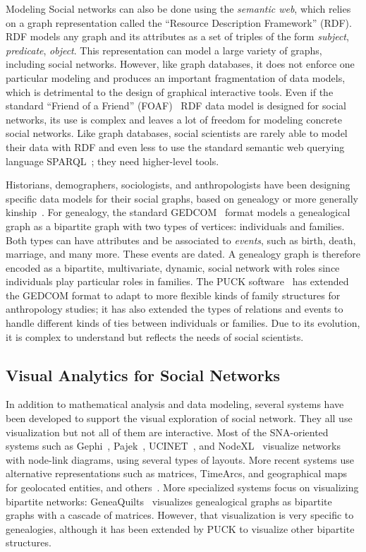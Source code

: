 Modeling Social networks can also be done using the \emph{semantic web}, which relies on a graph representation called the ``Resource Description Framework'' (RDF). RDF models any graph and its attributes as a set of triples of the form \emph{subject}, \emph{predicate}, \emph{object}. This representation can model a large variety of graphs, including social networks. However, like graph databases, it does not enforce one particular modeling and produces an important fragmentation of data models, which is detrimental to the design of graphical interactive tools. Even if the standard ``Friend of a Friend'' (FOAF)~\cite{FOAF2007} RDF data model is designed for social networks, its use is complex and leaves a lot of freedom for modeling concrete social networks.
Like graph databases, social scientists are rarely able to model their data with RDF and even less to use the standard semantic web querying language SPARQL~\cite{sparql}; they need higher-level tools.

Historians, demographers, sociologists, and anthropologists have been designing specific data models for their social graphs, based on genealogy or more generally kinship~\cite{hamberger:halshs-00658667}. For genealogy, the standard GEDCOM~\cite{gedcom} format models a genealogical graph as a bipartite graph with two types of vertices: individuals and families. Both types can have attributes and be associated to \emph{events}, such as birth, death, marriage, and many more. These events are dated. A genealogy graph is therefore encoded as a bipartite, multivariate, dynamic, social network with roles since individuals play particular roles in families. The PUCK software~\cite{PUCK} has extended the GEDCOM format to adapt to more flexible kinds of family structures for anthropology studies; it has also extended the types of relations and events to handle different kinds of ties between individuals or families. Due to its evolution, it is complex to understand but reflects the needs of social scientists.

\subsection{Visual Analytics for Social Networks}

In addition to mathematical analysis and data modeling, several systems have been developed to support the visual exploration of social network. They all use visualization but not all of them are interactive. Most of the SNA-oriented systems such as Gephi~\cite{Gephi}, Pajek~\cite{batagelj_pajek_nodate}, UCINET~\cite{ucinet}, and NodeXL~\cite{NodeXL} visualize networks with node-link diagrams, using several types of layouts.
More recent systems use alternative representations such as matrices, TimeArcs, and geographical maps for geolocated entities, and others~\cite{vistorian, valdivia:hal-02264960}.
More specialized systems focus on visualizing bipartite networks: GeneaQuilts~\cite{GeneaQuilts} visualizes genealogical graphs as bipartite graphs with a cascade of matrices. However, that visualization is very specific to genealogies, although it has been extended by PUCK to visualize other bipartite structures.

